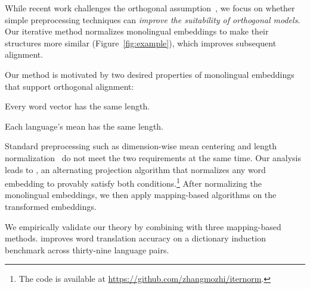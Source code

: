 While recent work challenges the orthogonal
assumption~\citep{doval-18,joulin-18,jawanpuria-19}, we focus on whether simple
preprocessing techniques can \emph{improve the suitability of orthogonal
models}.
Our iterative method normalizes monolingual embeddings to make their structures
more similar (Figure~\ref{fig:example}), which improves subsequent
alignment.

Our method is motivated by two desired properties of monolingual embeddings
that support orthogonal alignment:
\begin{enumerate*}
\item Every word vector has the same length.
\item Each language's mean has the same length.
\end{enumerate*}
Standard preprocessing such as dimension-wise mean centering and length
normalization~\cite{artetxe-16} do not meet the two requirements at
the same time.
%
Our analysis leads to \emph{\name{}}, an alternating projection
algorithm that normalizes any word embedding to provably satisfy both
conditions.\footnote{The code is available at \url{https://github.com/zhangmozhi/iternorm}.}
%
After normalizing the monolingual embeddings, we then apply
mapping-based  algorithms on the transformed embeddings.

We empirically validate our theory by combining \name{} with three
mapping-based  methods.
%
\name{} improves word translation accuracy on a dictionary induction benchmark
across thirty-nine language pairs.
